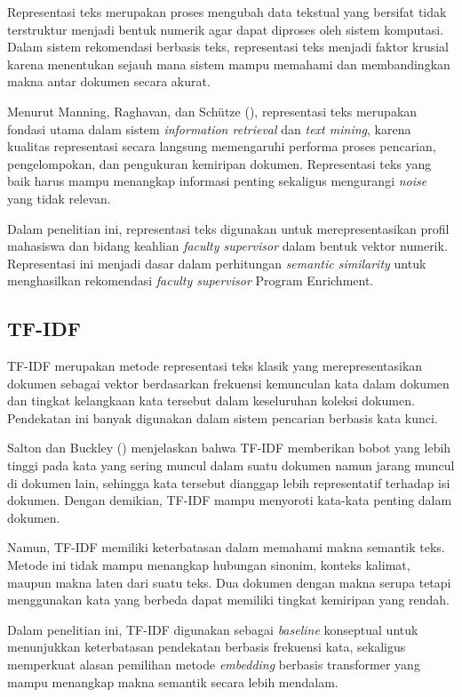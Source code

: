 Representasi teks merupakan proses mengubah data tekstual yang bersifat tidak terstruktur menjadi bentuk numerik agar dapat diproses oleh sistem komputasi. Dalam sistem rekomendasi berbasis teks, representasi teks menjadi faktor krusial karena menentukan sejauh mana sistem mampu memahami dan membandingkan makna antar dokumen secara akurat.

Menurut Manning, Raghavan, dan Schütze (\citeyear{manning2008ir}), representasi teks merupakan fondasi utama dalam sistem \textit{information retrieval} dan \textit{text mining}, karena kualitas representasi secara langsung memengaruhi performa proses pencarian, pengelompokan, dan pengukuran kemiripan dokumen. Representasi teks yang baik harus mampu menangkap informasi penting sekaligus mengurangi \textit{noise} yang tidak relevan.

Dalam penelitian ini, representasi teks digunakan untuk merepresentasikan profil mahasiswa dan bidang keahlian \textit{faculty supervisor} dalam bentuk vektor numerik. Representasi ini menjadi dasar dalam perhitungan \textit{semantic similarity} untuk menghasilkan rekomendasi \textit{faculty supervisor} Program Enrichment.

\subsection{TF-IDF}\label{tf-idf}

TF-IDF merupakan metode representasi teks klasik yang merepresentasikan dokumen sebagai vektor berdasarkan frekuensi kemunculan kata dalam dokumen dan tingkat kelangkaan kata tersebut dalam keseluruhan koleksi dokumen. Pendekatan ini banyak digunakan dalam sistem pencarian berbasis kata kunci.

Salton dan Buckley (\citeyear{salton1988tfidf}) menjelaskan bahwa TF-IDF memberikan bobot yang lebih tinggi pada kata yang sering muncul dalam suatu dokumen namun jarang muncul di dokumen lain, sehingga kata tersebut dianggap lebih representatif terhadap isi dokumen. Dengan demikian, TF-IDF mampu menyoroti kata-kata penting dalam dokumen.

Namun, TF-IDF memiliki keterbatasan dalam memahami makna semantik teks. Metode ini tidak mampu menangkap hubungan sinonim, konteks kalimat, maupun makna laten dari suatu teks. Dua dokumen dengan makna serupa tetapi menggunakan kata yang berbeda dapat memiliki tingkat kemiripan yang rendah.

Dalam penelitian ini, TF-IDF digunakan sebagai \textit{baseline} konseptual untuk menunjukkan keterbatasan pendekatan berbasis frekuensi kata, sekaligus memperkuat alasan pemilihan metode \textit{embedding} berbasis transformer yang mampu menangkap makna semantik secara lebih mendalam.

